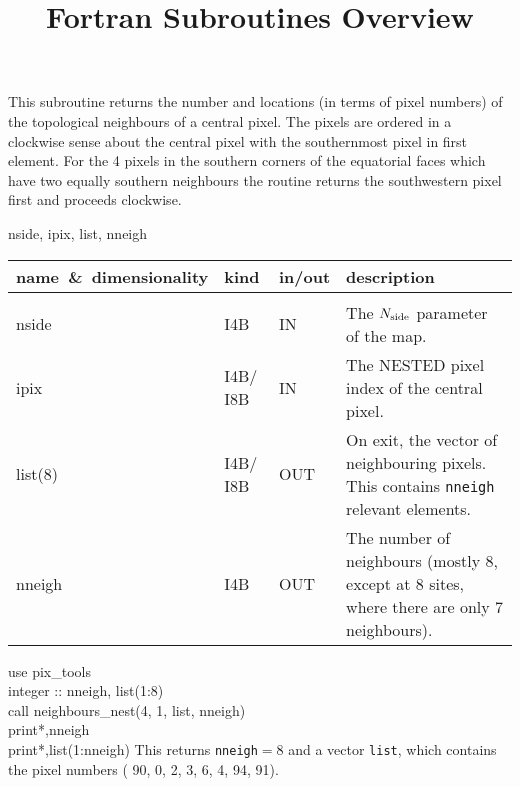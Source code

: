 
\sloppy

\title{\healpix Fortran Subroutines Overview}
 \section[neighbours\_nest]{ }
\label{sub:neighbours_nest}
\author{}

\begin{facility}
{This subroutine returns the number and locations (in terms of pixel
numbers) of the topological neighbours of a central pixel. The pixels
are ordered in a clockwise sense about the central pixel with the
southernmost pixel in first element. For the 4 pixels in the southern corners of the
equatorial faces which have two equally southern neighbours the
routine returns the southwestern pixel first and proceeds clockwise.}
{\modPixTools}
\end{facility}

\begin{f90format}
{nside, ipix, list, nneigh}
\end{f90format}

\begin{arguments}
{
\begin{tabular}{p{0.4\hsize} p{0.05\hsize} p{0.1\hsize} p{0.35\hsize}} \hline  
\textbf{name~\&~dimensionality} & \textbf{kind} & \textbf{in/out} & \textbf{description} \\ \hline
                   &   &   &                           \\ %
nside & I4B & IN & The ${N_{\rm side}}$ parameter of the map. \\
ipix & I4B/ I8B & IN & The NESTED pixel index of the central pixel. \\
list(8) & I4B/ I8B & OUT & On exit, the vector of neighbouring pixels. This
                   contains {\tt nneigh} relevant elements.\\
nneigh & I4B & OUT & The number of neighbours (mostly 8, except at
                   8 sites, where there are only 7 neighbours).\\
\end{tabular}
}
\end{arguments}

\begin{example}
{
use pix\_tools \\
integer :: nneigh, list(1:8) \\
call neighbours\_nest(4, 1, list, nneigh)  \\
print*,nneigh \\
print*,list(1:nneigh)
}
{
This returns {\tt nneigh}$=8$ and a vector {\tt list}, which contains the pixel
numbers ( 90,  0,  2,  3,  6,  4,  94,  91).}
\end{example}

